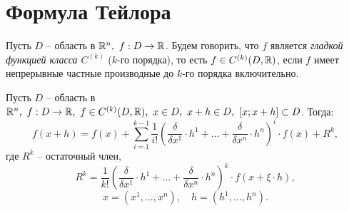 \section{Формула Тейлора}

\begin{definition}
    Пусть $ D $ -- область в $ \mathbb{R}^n, \ f:D \rightarrow \mathbb{R} $. Будем говорить, что $ f $ является \emph{гладкой функцией класса $ C^{(k)} $} ($ k $-го порядка), то есть $ f\in C^{(k)}(D,\mathbb{R}) $, если $ f $ имеет непрерывные частные производные до $k$-го порядка включительно.
\end{definition}

\begin{theorem}
    Пусть $D$ -- область в $\mathbb{R}^n, \ f:D\rightarrow\mathbb{R}, \ f\in C^{(k)}(D,\mathbb{R}), \ x \in D, \ x + h \in D, \ [x;x+h] \subset D$. Тогда:
    \[
        f(x + h) = f(x) + \sum_{i=1}^{k-1}\frac{1}{i!}\left(\frac{\delta}{\delta x^1}\cdot h^1 + \ldots + \frac{\delta}{\delta x^n}\cdot h^n\right)^i \cdot f(x) + R^k,
    \]
    где $R^k$ -- остаточный член,
    \[
        R^k = \frac{1}{k!}\left(\frac{\delta}{\delta x^1}\cdot h^1 + \ldots + \frac{\delta}{\delta x^n}\cdot h^n\right)^k \cdot f(x + \xi \cdot h),
    \]
    \[
        x = (x^1,\ldots,x^n), \quad h = (h^1,\ldots,h^n).
    \]
\end{theorem}

